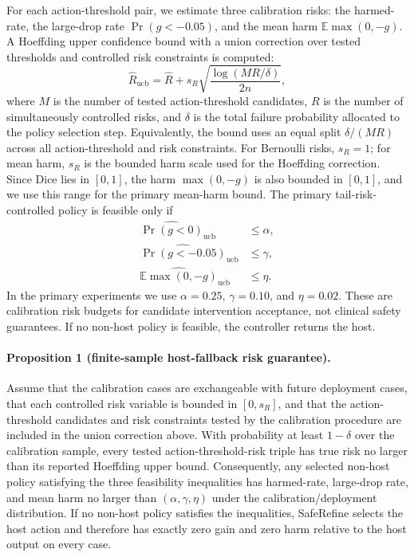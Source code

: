 \documentclass[preprint,12pt]{elsarticle}
\begin{document}
For each action-threshold pair, we estimate three calibration risks: the
harmed-rate, the large-drop rate $\Pr(g<-0.05)$, and the mean harm
$\mathbb{E}\max(0,-g)$. A Hoeffding upper confidence bound with a union
correction over tested thresholds and controlled risk constraints is computed:
\begin{equation}
    \widehat{R}_{\mathrm{ucb}} =
    \widehat{R} + s_R\sqrt{\frac{\log(MR/\delta)}{2n}},
\end{equation}
where $M$ is the number of tested action-threshold candidates, $R$ is the
number of simultaneously controlled risks, and $\delta$ is the total failure
probability allocated to the policy selection step. Equivalently, the bound
uses an equal split $\delta/(MR)$ across all action-threshold and risk
constraints. For Bernoulli risks, $s_R=1$; for mean harm, $s_R$ is the bounded
harm scale used for the Hoeffding correction. Since Dice lies in $[0,1]$, the
harm $\max(0,-g)$ is also bounded in $[0,1]$, and we use this range for the
primary mean-harm bound. The primary tail-risk-controlled policy is feasible
only if
\begin{align}
    \widehat{\Pr(g<0)}_{\mathrm{ucb}} &\leq \alpha, \\
    \widehat{\Pr(g<-0.05)}_{\mathrm{ucb}} &\leq \gamma, \\
    \widehat{\mathbb{E}\max(0,-g)}_{\mathrm{ucb}} &\leq \eta.
\end{align}
In the primary experiments we use $\alpha=0.25$, $\gamma=0.10$, and
$\eta=0.02$. These are calibration risk budgets for candidate intervention
acceptance, not clinical safety guarantees. If no non-host policy is feasible,
the controller returns the host.

\paragraph{Proposition 1 (finite-sample host-fallback risk guarantee).}
Assume that the calibration cases are exchangeable with future deployment
cases, that each controlled risk variable is bounded in $[0,s_R]$, and that
the action-threshold candidates and risk constraints tested by the calibration
procedure are included in the union correction above. With probability at
least $1-\delta$ over the calibration sample, every tested
action-threshold-risk triple has true risk no larger than its reported
Hoeffding upper bound. Consequently, any selected non-host policy satisfying
the three feasibility inequalities has harmed-rate, large-drop rate, and mean
harm no larger than $(\alpha,\gamma,\eta)$ under the calibration/deployment
distribution. If no non-host policy satisfies the inequalities, SafeRefine
selects the host action and therefore has exactly zero gain and zero harm
relative to the host output on every case.
\end{document}
